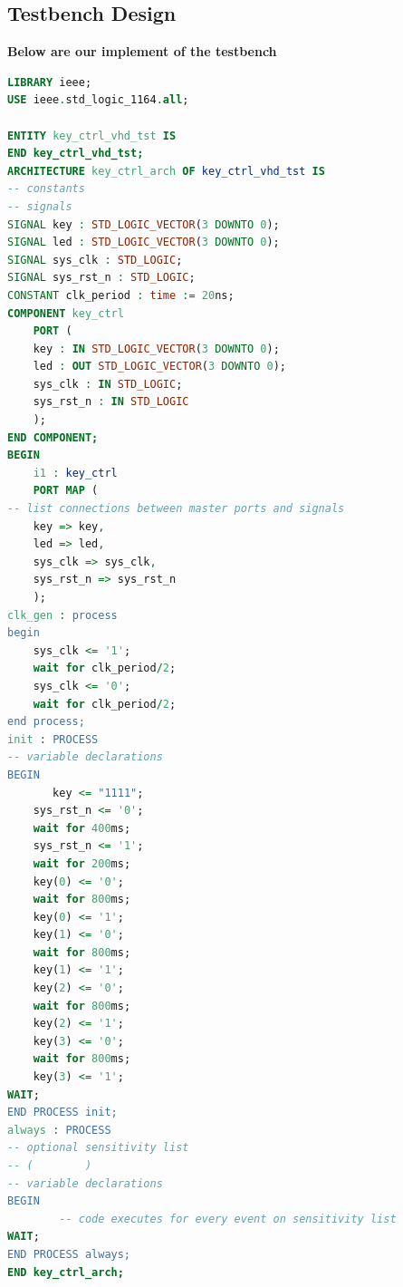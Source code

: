 \documentclass[]{article}
\begin{document}
\subsection{Testbench Design}
\renewcommand{\theenumi}{(\arabic{enumi})}

\noindent \textbf{Below are our implement of the testbench}\\

\begin{lstlisting}[language=VHDL]
LIBRARY ieee;                                               
USE ieee.std_logic_1164.all;                                

ENTITY key_ctrl_vhd_tst IS
END key_ctrl_vhd_tst;
ARCHITECTURE key_ctrl_arch OF key_ctrl_vhd_tst IS
-- constants                                                 
-- signals                                                   
SIGNAL key : STD_LOGIC_VECTOR(3 DOWNTO 0);
SIGNAL led : STD_LOGIC_VECTOR(3 DOWNTO 0);
SIGNAL sys_clk : STD_LOGIC;
SIGNAL sys_rst_n : STD_LOGIC;
CONSTANT clk_period : time := 20ns;
COMPONENT key_ctrl
    PORT (
    key : IN STD_LOGIC_VECTOR(3 DOWNTO 0);
    led : OUT STD_LOGIC_VECTOR(3 DOWNTO 0);
    sys_clk : IN STD_LOGIC;
    sys_rst_n : IN STD_LOGIC
    );
END COMPONENT;
BEGIN
    i1 : key_ctrl
    PORT MAP (
-- list connections between master ports and signals
    key => key,
    led => led,
    sys_clk => sys_clk,
    sys_rst_n => sys_rst_n
    );
clk_gen : process 
begin
    sys_clk <= '1';
    wait for clk_period/2;
    sys_clk <= '0';
    wait for clk_period/2;
end process;
init : PROCESS                                               
-- variable declarations                                     
BEGIN                                                        
       key <= "1111";
    sys_rst_n <= '0';
    wait for 400ms;
    sys_rst_n <= '1';
    wait for 200ms;
    key(0) <= '0';
    wait for 800ms;
    key(0) <= '1';
    key(1) <= '0';
    wait for 800ms;
    key(1) <= '1';
    key(2) <= '0';
    wait for 800ms;
    key(2) <= '1';
    key(3) <= '0';
    wait for 800ms;
    key(3) <= '1';                      
WAIT;                                                       
END PROCESS init;                                           
always : PROCESS                                              
-- optional sensitivity list                                  
-- (        )                                                 
-- variable declarations                                      
BEGIN                                                         
        -- code executes for every event on sensitivity list  
WAIT;                                                        
END PROCESS always;                                          
END key_ctrl_arch;

\end{lstlisting}
\end{document}
